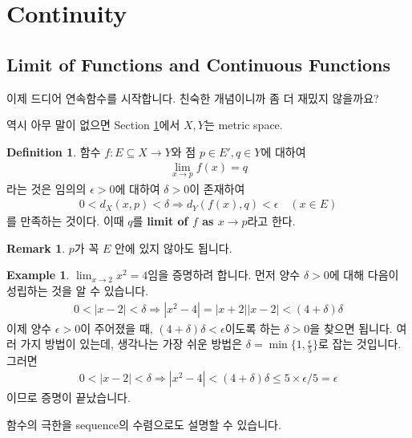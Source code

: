 \documentclass[12pt]{article}
\theoremstyle{definition}
\newtheorem{defn}[thm]{Definition}
\newtheorem*{rem}{Remark}
\newtheorem*{ex}{Example}
\def\eps{\epsilon}
\newcommand{\abs}[1]{\left\vert#1\right\vert}
\begin{document}
\section{Continuity} \label{sec cont}

\subsection{Limit of Functions and Continuous Functions}

이제 드디어 연속함수를 시작합니다. 친숙한 개념이니까 좀 더 재밌지 않을까요?

역시 아무 말이 없으면 Section \ref{sec cont}에서 \(X, Y\)는 metric space.

\begin{defn}
	함수 \(f: E \subseteq X \rightarrow Y\)와 점 \(p \in E', q \in Y\)에 대하여
	\begin{gather*}
		\lim_{x \rightarrow p} f(x) = q
	\end{gather*}
	라는 것은 임의의 \(\eps > 0\)에 대하여 \(\delta > 0\)이 존재하여
	\begin{gather*}
		0 < d_X (x, p) < \delta \Longrightarrow d_Y (f(x), q) < \eps \quad (x \in E)
	\end{gather*}
	를 만족하는 것이다. 이때 \(q\)를 \textbf{limit of \(f\) as \(x \rightarrow p\)}라고 한다.
\end{defn}
\begin{rem}
	\(p\)가 꼭 \(E\) 안에 있지 않아도 됩니다.
\end{rem}

\begin{ex}
	\(\lim_{x \rightarrow 2} x^2 = 4\)임을 증명하려 합니다. 먼저 양수 \(\delta > 0\)에 대해 다음이 성립하는 것을 알 수 있습니다.
	\begin{gather*}
		0 < \abs{x-2} < \delta \Longrightarrow \abs{x^2 - 4} = \abs{x + 2}\abs{x - 2} < (4 + \delta)\delta
	\end{gather*}
	이제 양수 \(\eps > 0\)이 주어졌을 때, \((4 + \delta)\delta < \eps\)이도록 하는 \(\delta > 0\)을 찾으면 됩니다. 여러 가지 방법이 있는데, 생각나는 가장 쉬운 방법은 \(\delta = \min\{1, \frac{\eps}{5}\}\)로 잡는 것입니다. 그러면
	\begin{gather*}
		0 < \abs{x-2} < \delta \Longrightarrow \abs{x^2 - 4} < (4 + \delta)\delta \le 5 \times \eps / 5 = \eps
	\end{gather*}
	이므로 증명이 끝났습니다.
\end{ex}

함수의 극한을 sequence의 수렴으로도 설명할 수 있습니다.
\end{document}
